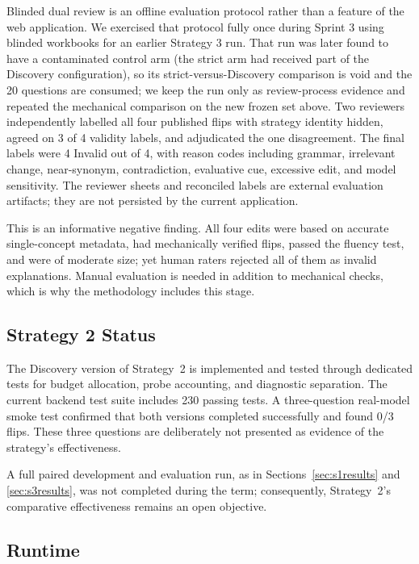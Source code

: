 \documentclass[11pt,a4paper]{article}
\begin{document}
Blinded dual review is an offline evaluation protocol rather than a feature of the web
application. We exercised that protocol fully once during Sprint 3 using blinded
workbooks for an earlier Strategy 3 run. That run was later found to have a
contaminated control arm (the strict arm had received part of the Discovery
configuration), so its strict-versus-Discovery comparison is void and the 20 questions
are consumed; we keep the run only as review-process evidence and repeated the
mechanical comparison on the new frozen set above. Two reviewers independently
labelled all four published flips with strategy identity hidden, agreed on 3 of 4
validity labels, and adjudicated the one disagreement. The final labels were 4 Invalid
out of 4, with reason codes including grammar, irrelevant change, near-synonym,
contradiction, evaluative cue, excessive edit, and model sensitivity. The reviewer
sheets and reconciled labels are external evaluation artifacts; they are not persisted
by the current application.

This is an informative negative finding. All four edits were based on accurate
single-concept metadata, had mechanically verified flips, passed the fluency test,
and were of moderate size; yet human raters rejected all of them as invalid
explanations. Manual evaluation is needed in addition to mechanical checks, which is
why the methodology includes this stage.

\subsection{Strategy 2 Status}

The Discovery version of Strategy~2 is implemented and tested through dedicated tests
for budget allocation, probe accounting, and diagnostic separation. The current
backend test suite includes 230 passing tests. A three-question real-model smoke test
confirmed that both versions completed successfully and found 0/3 flips. These three
questions are deliberately not presented as evidence of the strategy's effectiveness.

A full paired development and evaluation run, as in Sections~\ref{sec:s1results} and
\ref{sec:s3results}, was not completed during the term; consequently, Strategy~2's
comparative effectiveness remains an open objective.

\subsection{Runtime}
\label{sec:runtime}
\end{document}
